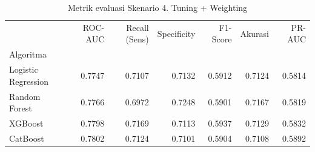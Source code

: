 \begin{table}[htbp]
\caption{Metrik evaluasi Skenario 4. Tuning + Weighting}
\label{tab:ablasi4}
\begin{tabular}{lrrrrrr}
\toprule
 & ROC-AUC & Recall (Sens) & Specificity & F1-Score & Akurasi & PR-AUC \\
Algoritma &  &  &  &  &  &  \\
\midrule
Logistic Regression & 0.7747 & 0.7107 & 0.7132 & 0.5912 & 0.7124 & 0.5814 \\
Random Forest & 0.7766 & 0.6972 & 0.7248 & 0.5901 & 0.7167 & 0.5819 \\
XGBoost & 0.7798 & 0.7169 & 0.7113 & 0.5937 & 0.7129 & 0.5832 \\
CatBoost & 0.7802 & 0.7124 & 0.7101 & 0.5904 & 0.7108 & 0.5892 \\
\bottomrule
\end{tabular}
\end{table}
